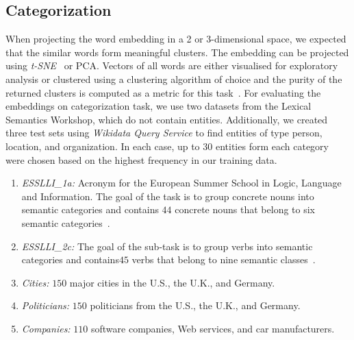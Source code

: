 \subsection{Categorization}
When projecting the word embedding in a 2 or 3-dimensional space, we expected that the similar words form meaningful clusters. The embedding can be projected using \emph{t-SNE}~ or PCA. Vectors of all words are either visualised for exploratory analysis or clustered using a clustering algorithm of choice and the purity of the returned clusters is computed as a metric for this task~. For evaluating the embeddings on categorization task, we use two datasets from the Lexical Semantics Workshop, which do not contain entities. Additionally, we created three test sets using \emph{Wikidata Query Service} to find entities of type person, location, and organization. In each case, up to $30$ entities form each category were chosen based on the highest frequency in our training data. 
\begin{enumerate}
  \item \emph{ESSLLI\_1a:} Acronym for the European Summer School in Logic, Language
and Information. The goal of the task is to group concrete nouns into semantic categories and contains $44$ concrete nouns that belong to six semantic categories~. 
  \item \emph{ESSLLI\_2c:} The goal of the sub-task is to group verbs into semantic categories and contains$45$ verbs that belong to nine semantic classes~.
  \item \emph{Cities:} $150$ major cities in the U.S., the U.K., and Germany. 
  \item \emph{Politicians:} $150$ politicians from the U.S., the U.K., and Germany.
  \item \emph{Companies:} $110$ software companies, Web services, and car manufacturers. 
\end{enumerate}

